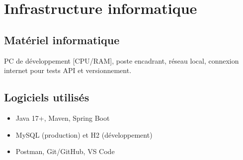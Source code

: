 \chapter{Infrastructure informatique}

\section{Matériel informatique}
PC de développement [CPU/RAM], poste encadrant, réseau local, connexion internet pour tests API et versionnement.

\section{Logiciels utilisés}
\begin{itemize}
  \item Java 17+, Maven, Spring Boot
  \item MySQL (production) et H2 (développement)
  \item Postman, Git/GitHub, VS Code
\end{itemize}
